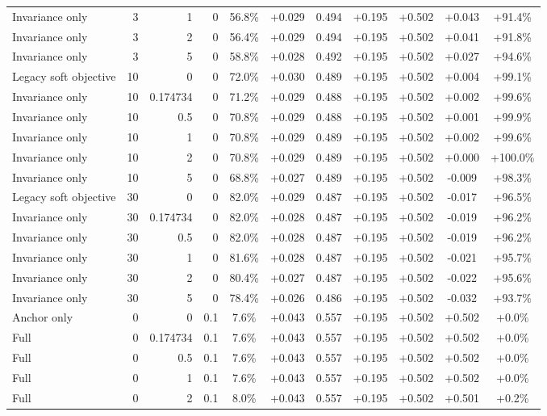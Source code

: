 \begin{table}[htbp]
\begin{tabular}{lrrrccccccc}
Invariance only & 3 & 1 & 0 & 56.8\% & +0.029 & 0.494 & +0.195 & +0.502 & +0.043 & +91.4\% \\
Invariance only & 3 & 2 & 0 & 56.4\% & +0.029 & 0.494 & +0.195 & +0.502 & +0.041 & +91.8\% \\
Invariance only & 3 & 5 & 0 & 58.8\% & +0.028 & 0.492 & +0.195 & +0.502 & +0.027 & +94.6\% \\
Legacy soft objective & 10 & 0 & 0 & 72.0\% & +0.030 & 0.489 & +0.195 & +0.502 & +0.004 & +99.1\% \\
Invariance only & 10 & 0.174734 & 0 & 71.2\% & +0.029 & 0.488 & +0.195 & +0.502 & +0.002 & +99.6\% \\
Invariance only & 10 & 0.5 & 0 & 70.8\% & +0.029 & 0.488 & +0.195 & +0.502 & +0.001 & +99.9\% \\
Invariance only & 10 & 1 & 0 & 70.8\% & +0.029 & 0.489 & +0.195 & +0.502 & +0.002 & +99.6\% \\
Invariance only & 10 & 2 & 0 & 70.8\% & +0.029 & 0.489 & +0.195 & +0.502 & +0.000 & +100.0\% \\
Invariance only & 10 & 5 & 0 & 68.8\% & +0.027 & 0.489 & +0.195 & +0.502 & -0.009 & +98.3\% \\
Legacy soft objective & 30 & 0 & 0 & 82.0\% & +0.029 & 0.487 & +0.195 & +0.502 & -0.017 & +96.5\% \\
Invariance only & 30 & 0.174734 & 0 & 82.0\% & +0.028 & 0.487 & +0.195 & +0.502 & -0.019 & +96.2\% \\
Invariance only & 30 & 0.5 & 0 & 82.0\% & +0.028 & 0.487 & +0.195 & +0.502 & -0.019 & +96.2\% \\
Invariance only & 30 & 1 & 0 & 81.6\% & +0.028 & 0.487 & +0.195 & +0.502 & -0.021 & +95.7\% \\
Invariance only & 30 & 2 & 0 & 80.4\% & +0.027 & 0.487 & +0.195 & +0.502 & -0.022 & +95.6\% \\
Invariance only & 30 & 5 & 0 & 78.4\% & +0.026 & 0.486 & +0.195 & +0.502 & -0.032 & +93.7\% \\
Anchor only & 0 & 0 & 0.1 & 7.6\% & +0.043 & 0.557 & +0.195 & +0.502 & +0.502 & +0.0\% \\
Full & 0 & 0.174734 & 0.1 & 7.6\% & +0.043 & 0.557 & +0.195 & +0.502 & +0.502 & +0.0\% \\
Full & 0 & 0.5 & 0.1 & 7.6\% & +0.043 & 0.557 & +0.195 & +0.502 & +0.502 & +0.0\% \\
Full & 0 & 1 & 0.1 & 7.6\% & +0.043 & 0.557 & +0.195 & +0.502 & +0.502 & +0.0\% \\
Full & 0 & 2 & 0.1 & 8.0\% & +0.043 & 0.557 & +0.195 & +0.502 & +0.501 & +0.2\% \\

\end{tabular}
\end{table}
